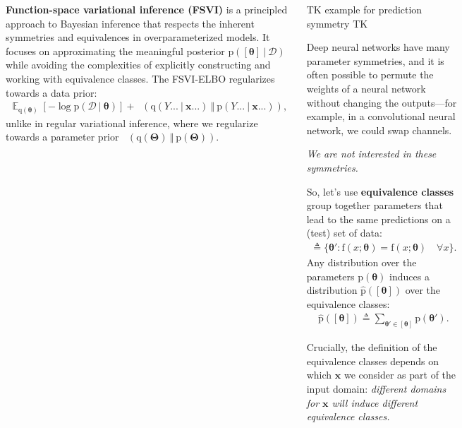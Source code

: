 \documentclass[25pt,a0paper,landscape]{tikzposter}
\DeclareMathOperator{\opExpectation}{\mathbb{E}}
\newcommand{\E}[2]{\opExpectation_{#1} \left [ #2 \right ]}
\newcommand{\MidSymbol}[1][]{\:#1\:}
\newcommand{\given}{\MidSymbol[\vert]}
\DeclareMathOperator{\opKale}{D_\mathrm{KL}}
\newcommand{\Kale}[2]{\opKale(#1 \MidSymbol[\Vert] #2)}
\newcommand{\opp}{\mathrm{p}}
\newcommand{\pof}[1]{\opp(#1)}
\newcommand{\hpof}[1]{\hat{\opp}(#1)}
\newcommand{\opq}{\mathrm{q}}
\newcommand{\qof}[1]{\opq(#1)}
\newcommand{\w}{\boldsymbol{\theta}}
\newcommand{\W}{\boldsymbol{\Theta}}
\newcommand{\opf}{\mathrm{f}}
\newcommand{\fof}[1]{\opf(#1)}
\newcommand{\Dany}{\mathcal{D}}
\newcommand{\Y}{Y}
\newcommand{\x}{\boldsymbol{x}}
\begin{document}
\begin{columns}
{\begin{tcolorbox}[colback=green!5!white,colframe=teal!75!black,title=From KL to Jenson-Shannon Divergence to Mutual Information]
\begin{multicols}{2}
\end{multicols}
\end{tcolorbox}
}
{
  \begin{tcolorbox}[colback=green!5!white,colframe=teal!75!black,title=\textbf{TL;DR}]
    \textbf{Function-space variational inference (FSVI)} is a principled approach to Bayesian inference that respects the inherent symmetries and equivalences in overparameterized models. It focuses on approximating the meaningful posterior $\pof{[\w] \given \Dany}$ while avoiding the complexities of explicitly constructing and working with equivalence classes.
    The FSVI-ELBO regularizes towards a data prior:
    $$
    \begin{aligned}
    \E{\qof{\w}}{-\log \pof{\Dany \given \w}} + \Kale{\qof{\Y... \given \x...}}{\pof{\Y... \given \x...}},
    \end{aligned}
    $$
    unlike in regular variational inference, where we regularize towards a parameter prior $\Kale{\qof{\W}}{\pof{\W}}$.
  \end{tcolorbox}
  \begin{multicols}{2}
    TK example for prediction symmetry TK
    \begin{tcolorbox}[colback=green!5!white,colframe=teal!75!black,title=Prediction Equivalence]
      Deep neural networks have many parameter symmetries, and it is often possible to permute the weights of a neural network without changing the outputs---for example, in a convolutional neural network, we could swap channels.

      \emph{We are not interested in these symmetries.} 
      
      So, let's use \textbf{equivalence classes} group together parameters that lead to the same predictions on a (test) set of data:
      \begin{align}
        [\w] \triangleq \{\w' : \fof{x ; \w} = \fof{x ; \w} \quad \forall x \}.
      \end{align}
      Any distribution over the parameters $\pof{\w}$ induces a distribution $\hpof{[\w]}$ over the equivalence classes:
      \begin{align}
        \hpof{[\w]} \triangleq \sum_{\w' \in [\w]} \pof{\w'}.
      \end{align}

      Crucially, the definition of the equivalence classes depends on which $\x$ we consider as part of the input domain: \emph{different domains for $\x$ will induce different equivalence classes.}


\end{tcolorbox}
\end{multicols}}
\end{columns}
\end{document}
